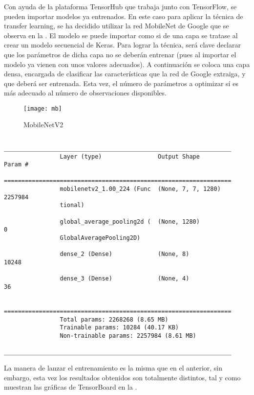 			Con ayuda de la plataforma TensorHub que trabaja junto con TensorFlow, se pueden importar modelos ya entrenados. En este caso para aplicar la técnica de transfer learning, se ha decidido utilizar la red MobileNet de Google que se observa en la . El modelo se puede importar como si de una capa se tratase al crear un modelo secuencial de Keras. Para lograr la técnica, será clave declarar que los parámetros de dicha capa no se deberán entrenar (pues al importar el modelo ya vienen con unos valores adecuados). A continuación se coloca una capa densa, encargada de clasificar las características que la red de Google extraiga, y que deberá ser entrenada. Esta vez, el número de parámetros a optimizar sí es más adecuado al número de observaciones disponibles. 
			
			\begin{figure}[!h]
				\centering
				\texttt{[image: mb]}
				\caption{MobileNetV2}
				\label{fig:mb}
			\end{figure}
			
			\begin{verbatim}
				_________________________________________________________________
				Layer (type)                Output Shape              Param #   
				=================================================================
				mobilenetv2_1.00_224 (Func  (None, 7, 7, 1280)        2257984   
				tional)                                                         
				
				global_average_pooling2d (  (None, 1280)              0         
				GlobalAveragePooling2D)                                         
				
				dense_2 (Dense)             (None, 8)                 10248     
				
				dense_3 (Dense)             (None, 4)                 36        
				
				=================================================================
				Total params: 2268268 (8.65 MB)
				Trainable params: 10284 (40.17 KB)
				Non-trainable params: 2257984 (8.61 MB)
				_________________________________________________________________
			\end{verbatim}
			
			La manera de lanzar el entrenamiento es la misma que en el anterior, sin embargo, esta vez los resultados obtenidos son totalmente distintos, tal y como muestran las gráficas de TensorBoard en la . \\
			
